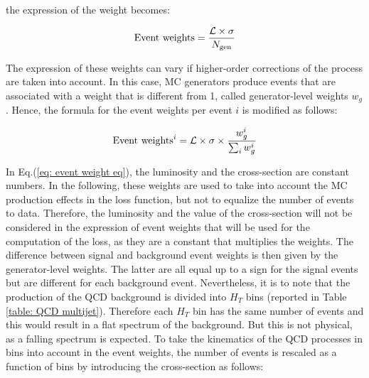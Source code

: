 \noindent the expression of the weight becomes:

\begin{equation}
    \text{Event weights} = \frac{{\mathcal{L}} \times \sigma}{N_{\text{gen}}}
\end{equation}

The expression of these weights can vary if higher-order corrections of the process are taken into account. In this case, MC generators produce events that are associated with a weight that is different from 1, called generator-level weights $w_g$.
Hence, the formula for the event weights per event $i$ is modified as follows:

\begin{equation}
    \text{Event weights}^i = {\mathcal{L}} \times \sigma \times \frac{w_g^i}{\sum_i w_g^i}
    \label{eq: event weight eq}
\end{equation}

In Eq.(\ref{eq: event weight eq}), the luminosity and the cross-section are constant numbers. In the following, these weights are used to take into account the MC production effects in the loss function, but not to equalize the number of events to data. Therefore, the luminosity and the value of the cross-section will not be considered in the expression of event weights that will be used for the computation of the loss, as they are a constant that multiplies the weights. The difference between signal and background event weights is then given by the generator-level weights. The latter are all equal up to a sign for the signal events but are different for each background event. Nevertheless, it is to note that the production of the QCD background is divided into $H_T$ bins (reported in Table \ref{table: QCD  multijet}). Therefore each $H_T$ bin has the same number of events and this would result in a flat \Ht spectrum of the background. But this is not physical, as a falling \Ht spectrum is expected. To take the kinematics of the QCD processes in \Ht bins into account in the event weights, the number of events is rescaled as a function of \Ht bins by introducing the cross-section as follows:



